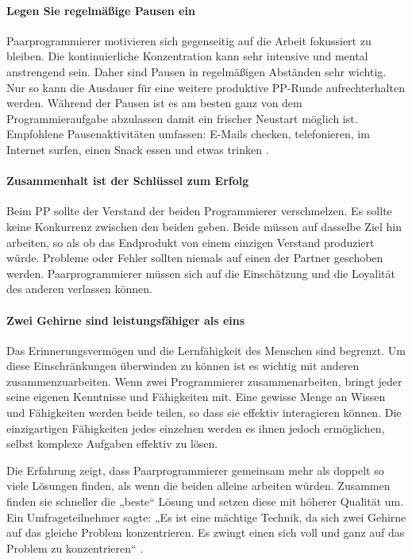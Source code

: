 \paragraph{ Legen Sie regelmäßige Pausen ein} Paarprogrammierer motivieren sich gegenseitig auf die Arbeit fokussiert zu bleiben. Die kontinuierliche Konzentration kann sehr intensive und mental anstrengend sein. Daher sind Pausen in regelmäßigen Abständen sehr wichtig. Nur so kann die Ausdauer für eine weitere produktive PP-Runde aufrechterhalten werden. Während der Pausen ist es am besten ganz von dem Programmieraufgabe abzulassen damit ein frischer Neustart möglich ist. Empfohlene Pausenaktivitäten umfassen: E-Mails checken, telefonieren, im Internet surfen, einen Snack essen und etwas trinken \cite{Williams2000AllKindergarten}.

\paragraph{ Zusammenhalt ist der Schlüssel zum Erfolg} Beim PP sollte der Verstand der beiden Programmierer verschmelzen. Es sollte keine Konkurrenz zwischen den beiden geben. Beide müssen auf dasselbe Ziel hin arbeiten, so als ob das Endprodukt von einem einzigen Verstand produziert würde. Probleme oder Fehler sollten niemals auf einen der Partner geschoben werden. Paarprogrammierer müssen sich auf die Einschätzung und die Loyalität des anderen verlassen können.

\paragraph{ Zwei Gehirne sind leistungsfähiger als eins} Das Erinnerungsvermögen und die Lernfähigkeit des Menschen sind begrenzt. Um diese Einschränkungen überwinden zu können ist es wichtig mit anderen zusammenzuarbeiten. Wenn zwei Programmierer zusammenarbeiten, bringt jeder seine eigenen Kenntnisse und Fähigkeiten mit. Eine gewisse Menge an Wissen und Fähigkeiten werden beide teilen, so dass sie effektiv interagieren können. Die einzigartigen Fähigkeiten jedes einzelnen werden es ihnen jedoch ermöglichen, selbst komplexe Aufgaben effektiv zu lösen.

Die Erfahrung zeigt, dass Paarprogrammierer gemeinsam mehr als doppelt so viele Lösungen finden, als wenn die beiden alleine arbeiten würden. Zusammen finden sie schneller die „beste“ Lösung und setzen diese mit höherer Qualität um. Ein Umfrageteilnehmer sagte: „Es ist eine mächtige Technik, da sich zwei Gehirne auf das gleiche Problem konzentrieren. Es zwingt einen sich voll und ganz auf das Problem zu konzentrieren“ \cite{Williams2000AllKindergarten}.



